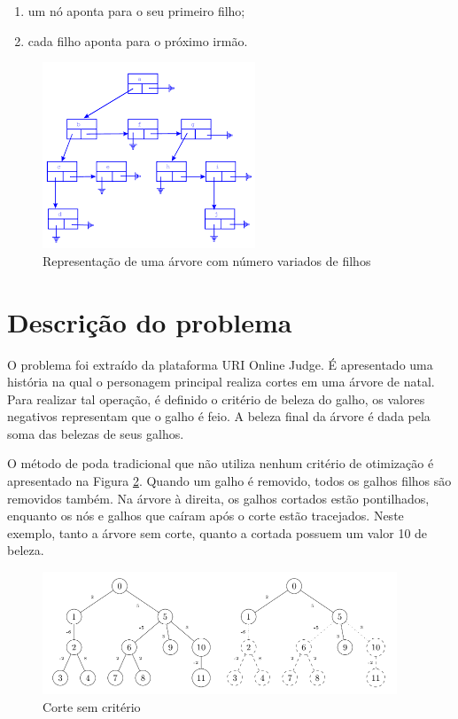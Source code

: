 \documentclass[12pt]{article}
\begin{document}
\begin{enumerate}
    \item um nó aponta para o seu primeiro filho;
    \item cada filho aponta para o próximo irmão.
\end{enumerate}

\begin{figure}[ht]
\centering
\includegraphics[width=.5\textwidth]{arvore-n-filhos.png}
\caption{Representação de uma árvore com número variados de filhos}
\label{fig:arvore-n-filhos}
\end{figure}

\section{Descrição do problema}\label{sec:problema}

O problema foi extraído da plataforma URI Online Judge. É apresentado uma história na qual o personagem principal realiza cortes em uma árvore de natal. Para realizar tal operação, é definido o critério de beleza do galho, os valores negativos representam que o galho é feio. A beleza final da árvore é dada pela soma das belezas de seus galhos. 

O método de poda tradicional que não utiliza nenhum critério de otimização é apresentado na Figura \ref{fig:2575_a}. Quando um galho é removido, todos os galhos filhos são removidos também. Na árvore à direita, os galhos cortados estão pontilhados, enquanto os nós e galhos que caíram após o corte estão tracejados. Neste exemplo, tanto a árvore sem corte, quanto a cortada possuem um valor 10 de beleza.

\begin{figure}[ht]
\centering
\includegraphics[width=.5\textwidth]{2575_a.png}
\caption{Corte sem critério}
\label{fig:2575_a}
\end{figure}
\end{document}
